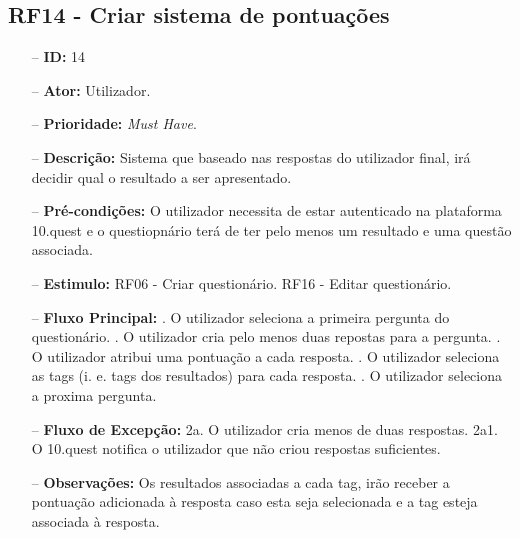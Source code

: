 \subsection{RF14 - Criar sistema de pontuações}
\begin{itemize}
	\item[--] \textbf{ID:} 14
	\item[--]  \textbf{Ator:} Utilizador.
	\item[--]  \textbf{Prioridade:} \textit{Must Have}.
	\item[--]  \textbf{Descrição:} Sistema que baseado nas respostas do utilizador final, irá decidir qual o resultado a ser apresentado.
	\item[--]  \textbf{Pré-condições:}  O utilizador necessita de estar autenticado na plataforma 10.quest e o questiopnário terá de ter pelo menos um resultado e uma questão associada.
	\item[--]  \textbf{Estimulo:}  
		\subitem RF06 - Criar questionário.
		\subitem RF16 - Editar questionário.
	\item[--]  \textbf{Fluxo Principal:} 
		. O utilizador seleciona a primeira pergunta do questionário.
		. O utilizador cria pelo menos duas repostas para a pergunta.
		. O utilizador atribui uma pontuação a cada resposta.
		. O utilizador seleciona as tags (i. e. tags dos resultados) para cada resposta.
		. O utilizador seleciona a proxima pergunta.
	\item[--]  \textbf{Fluxo de Excepção:} 
		\subitem 2a. O utilizador cria menos de duas respostas.
		\subitem 2a1. O 10.quest notifica o utilizador que não criou respostas suficientes.
	\item[--]  \textbf{Observações:} Os resultados associadas a cada tag, irão receber a pontuação adicionada à resposta caso esta seja selecionada e a tag esteja associada à resposta.
\end{itemize}
\newpage

